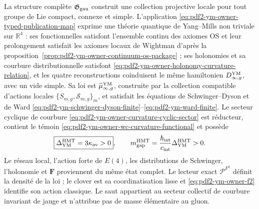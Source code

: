 \begin{theorem}
\label{thm:pdf2-ym-cierre-global}
La structure complète $\mathfrak G_{\rm gau}$ construit une collection projective locale pour tout groupe de Lie compact, connexe et simple. L'application \eqref{eq:pdf2-ym-owner-typed-publication-map} exprime une théorie quantique de Yang--Mills non triviale sur $\mathbb R^4$ : ses fonctionnelles satisfont l'ensemble continu des axiomes OS et leur prolongement satisfait les axiomes locaux de Wightman d'après la proposition~\ref{prop:pdf2-ym-owner-continuum-os-package} ; ses holonomies et sa courbure distributionnelle satisfont \eqref{eq:pdf2-ym-owner-holonomy-curvature-relation}, et les quatre reconstructions coinduisent le même hamiltonien $D_{\infty,g}^{\rm YM}$, avec un vide simple. Sa loi est $\widehat\mu_{\infty,g}^{\rm YM}$, construite par la collection compatible d'actions locales $\{S_{m,g},\mathscr S_{m,g}\}_m$, et satisfait les équations de Schwinger--Dyson et de Ward \eqref{eq:pdf2-ym-schwinger-dyson-finite}--\eqref{eq:pdf2-ym-ward-finite}. Le secteur cyclique de courbure \eqref{eq:pdf2-ym-owner-curvature-cyclic-sector} est réducteur, contient le témoin \eqref{eq:pdf2-ym-owner-wc-curvature-functional} et possède
\begin{equation}\label{eq:pdf2-ym-final-gap}
 \boxed{\Delta_{\rm YM}^{\rm HMT}=3\kappa_{\rm av}>0},
 \qquad
 m_{\rm gap}^{\rm HMT}
 =\frac{\hbar_{\rm int}}{c_{\rm int}}\Delta_{\rm YM}^{\rm HMT}>0.
\end{equation}
Le réseau local, l'action forte de $E(4)$, les distributions de Schwinger, l'holonomie et $\mathbf F$ proviennent du même état complet. Le lecteur exact $\mathcal P^{F^2}$ définit la densité de la loi ; le clover est sa coordinatisation lisse et \eqref{eq:pdf2-ym-owner-f2} identifie son action classique. Le saut appartient au secteur collectif de courbure invariant de jauge et n'attribue pas de masse élémentaire au gluon.
\end{theorem}

